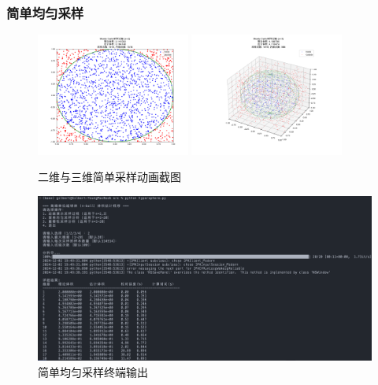 \subsubsection{简单均匀采样}
\begin{figure}[H]
    \centering
    \includegraphics[width=0.45\textwidth]{Problem_1/figs/2d_anim.png}
    \includegraphics[width=0.45\textwidth]{Problem_1/figs/3d_anim.png}
    \caption{二维与三维简单采样动画截图}
\end{figure}
\begin{figure}[H]
    \centering
    \includegraphics[width=1.0\textwidth]{Problem_1/figs/simple_terminal.png}
    \caption{简单均匀采样终端输出}
\end{figure}

